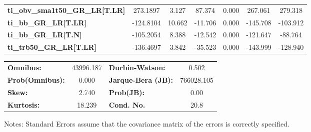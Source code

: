 \begin{center}
\begin{tabular}{lcccccc}
\textbf{ti\_obv\_sma1t50\_GR\_LR[T.LR]} &     273.1897  &        3.127     &    87.374  &         0.000        &      267.061    &      279.318     \\
\textbf{ti\_bb\_GR\_LR[T.LR]}           &    -124.8104  &       10.662     &   -11.706  &         0.000        &     -145.708    &     -103.912     \\
\textbf{ti\_bb\_GR\_LR[T.N]}            &    -105.2054  &        8.388     &   -12.542  &         0.000        &     -121.647    &      -88.764     \\
\textbf{ti\_trb50\_GR\_LR[T.LR]}        &    -136.4697  &        3.842     &   -35.523  &         0.000        &     -143.999    &     -128.940     \\
\bottomrule
\end{tabular}
\begin{tabular}{lclc}
\textbf{Omnibus:}       & 43996.187 & \textbf{  Durbin-Watson:     } &     0.502   \\
\textbf{Prob(Omnibus):} &    0.000  & \textbf{  Jarque-Bera (JB):  } & 766028.105  \\
\textbf{Skew:}          &    2.740  & \textbf{  Prob(JB):          } &      0.00   \\
\textbf{Kurtosis:}      &   18.239  & \textbf{  Cond. No.          } &      20.8   \\
\bottomrule
\end{tabular}
\end{center}

Notes: \newline
 [1] Standard Errors assume that the covariance matrix of the errors is correctly specified.

